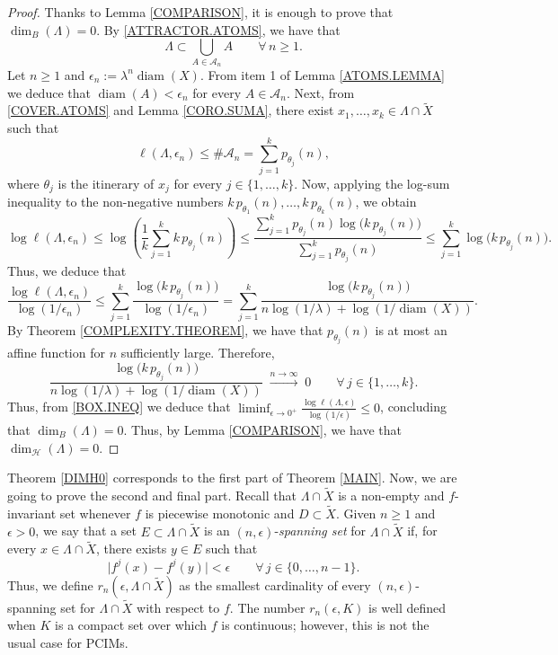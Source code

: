 \documentclass[a4paper]{article}
\DeclareMathOperator{\diam}{diam}
\begin{document}
\begin{proof}
    Thanks to Lemma \ref{COMPARISON}, it is enough to prove that $\dim_B(\Lambda)=0$. By \eqref{ATTRACTOR.ATOMS}, we have that
    \begin{equation}
        \Lambda\subset \bigcup_{A\in\mathcal A_n}A\qquad\forall\,n\geq1.\label{COVER.ATOMS}
    \end{equation}
    Let $n\geq1$ and $\epsilon_n:=\lambda^n\diam(X)$. From item 1 of Lemma \ref{ATOMS.LEMMA} we deduce that $\diam(A)<\epsilon_n$ for every $A\in\mathcal A_n$. Next, from \eqref{COVER.ATOMS} and Lemma \ref{CORO.SUMA}, there exist $x_1,\ldots,x_k\in\Lambda\cap\widetilde X$ such that
    \[
        \ell(\Lambda,\epsilon_n)\leq \#\mathcal A_{n}=\sum_{j=1}^k p_{\theta_j}(n),
    \]
    where $\theta_j$ is the itinerary of $x_j$ for every $j\in\{1,\ldots,k\}$. Now, applying the log-sum inequality to the non-negative numbers $k\,p_{\theta_1}(n),\ldots,k\,p_{\theta_k}(n)$, we obtain
    \[
        \log \ell(\Lambda,\epsilon_n)\leq \log\!\left(\frac{1}{k}\sum_{j=1}^k k\,p_{\theta_j}(n)\!\right)\leq \frac{\sum\limits_{j=1}^k p_{\theta_j}(n)\log \!\big(k\,p_{\theta_j}(n)\big)}{\sum\limits_{j=1}^k p_{\theta_j}(n)}\leq \sum_{j=1}^k \log \!\big(k\,p_{\theta_j}(n)\big).
    \]
    Thus, we deduce that
    \begin{equation}
        \frac{\log \ell(\Lambda,\epsilon_n)}{\log(1/\epsilon_n)}\leq \sum_{j=1}^k\frac{\log \!\big(k\,p_{\theta_j}(n)\big)}{\log(1/\epsilon_n)}=\sum_{j=1}^k\frac{\log \!\big(k\,p_{\theta_j}(n)\big)}{n\log(1/\lambda)+\log(1/\diam(X))}.
        \label{BOX.INEQ}
    \end{equation}
    By Theorem \ref{COMPLEXITY.THEOREM}, we have that $p_{\theta_j}(n)$ is at most an affine function for $n$ sufficiently large. Therefore, 
    \[
        \frac{\log\!\big(k\,p_{\theta_j}(n)\big)}{n\log(1/\lambda)+\log(1/\diam(X))}\;\stackrel{n\to\infty}\longrightarrow\; 0\qquad\forall\,j\in\{1,\ldots,k\}.
    \]
    Thus, from \eqref{BOX.INEQ} we deduce that {$\liminf_{\epsilon \to 0^+} \frac{\log \ell(\Lambda,\epsilon)}{\log(1/\epsilon)}\leq 0$}, concluding that {$\dim_B(\Lambda)=0$}. Thus, by Lemma \ref{COMPARISON}, we have that {$\dim_{\mathcal H}(\Lambda)=0$}.
\end{proof}

Theorem \ref{DIMH0} corresponds to the first part of Theorem \ref{MAIN}. Now, we are going to prove the second and final part. Recall that $\Lambda\cap\widetilde X$ is a non-empty and $f$-invariant set whenever $f$ is piecewise monotonic and $D\subset\widetilde X$. Given $n\geq1$ and $\epsilon>0$, we say that a set {$E\subset \Lambda\cap\widetilde X$} is an $(n,\epsilon)$-{\em spanning set} for $\Lambda\cap\widetilde X$ if, for every $x\in\Lambda\cap\widetilde X$, there exists $y\in E$ such that
\[
    \big|f^j(x)-f^j(y)\big|<\epsilon\qquad\forall\,j\in\{0,\ldots,n-1\}.
\]
Thus, we define $r_n(\epsilon,\Lambda\cap\widetilde X)$ as the smallest cardinality of every $(n,\epsilon)$-spanning set for $\Lambda\cap\widetilde X$ with respect to $f$. The number $r_n(\epsilon,K)$ is well defined when $K$ is a compact set over which $f$ is continuous; however, this is not the usual case for PCIMs.
\end{document}
